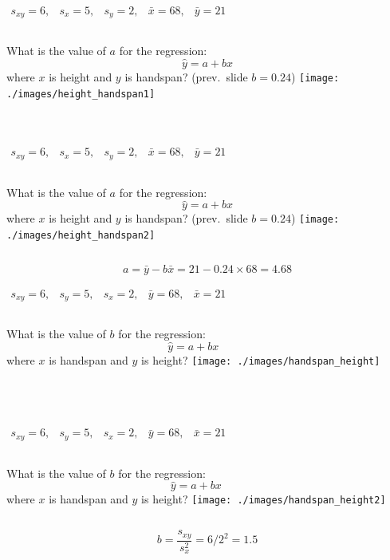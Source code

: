 \documentclass{beamer}
\begin{document}
\begin{frame}
$\begin{array}{ccccc} s_{xy} = 6,&s_x = 5,& s_y = 2,& \bar{x} = 68,& \bar{y} = 21\end{array}$
\begin{columns}[c]
\column{2.5in}
What is the value of $a$ for the regression: $$\hat{y}=a+bx$$
where $x$ is height and $y$ is handspan? (prev.\ slide $b = 0.24$)
\column{1.8in}
\texttt{[image: ./images/height\_handspan1]}
\end{columns}
\alert{$$\phantom{a = \bar{y} - b \bar{x} = 20.6 - 0.297 \times 67.6 \approx 0.5}$$}
\end{frame}
\begin{frame}
$\begin{array}{ccccc} s_{xy} = 6,&s_x = 5,& s_y = 2,& \bar{x} = 68,& \bar{y} = 21\end{array}$
\begin{columns}[c]
\column{2.5in}
What is the value of $a$ for the regression: $$\hat{y}=a+bx$$
where $x$ is height and $y$ is handspan? (prev.\ slide $b = 0.24$)
\column{1.8in}
\texttt{[image: ./images/height\_handspan2]}
\end{columns}
\alert{$$a = \bar{y} - b \bar{x} = 21 - 0.24 \times 68 = 4.68 $$}
\end{frame}
\begin{frame}
\alert{$\begin{array}{ccccc} s_{xy} = 6,&s_y = 5,& s_x = 2,& \bar{y} = 68,& \bar{x} = 21\end{array}$}
\begin{columns}[c]
\column{2.5in}
What is the value of $b$ for the regression: $$\hat{y}=a+bx$$
where \alert{$x$ is handspan and $y$ is height? }
\column{1.8in}
\texttt{[image: ./images/handspan\_height]}
\end{columns}
\alert{$$\phantom{b = \frac{s_{xy}}{s_x^2} = 6 /2.2^2 \approx 1.2}$$}
\end{frame}
\begin{frame}
\alert{$\begin{array}{ccccc} s_{xy} = 6,&s_y = 5,& s_x = 2,& \bar{y} = 68,& \bar{x} = 21\end{array}$}
\begin{columns}[c]
\column{2.5in}
What is the value of $b$ for the regression: $$\hat{y}=a+bx$$
where \alert{$x$ is handspan and $y$ is height? }
\column{1.8in}
\texttt{[image: ./images/handspan\_height2]}
\end{columns}
\alert{$$b = \frac{s_{xy}}{s_x^2} = 6 /2^2 = 1.5 $$}
\end{frame}
\end{document}
